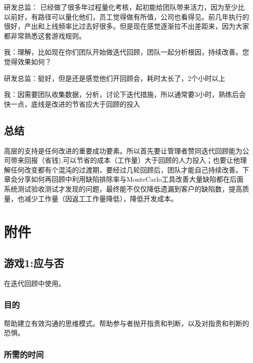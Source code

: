 研发总监：
已经做了很多年过程量化考核，起初能给团队带来活力，因为至少比以前好，有路径可以量化他们，员工觉得做有所值，公司也看得见。前几年执行的很好，产出和上线频率比过去好很多。但是现在感觉逐渐拉不出差距来，因为大家都非常熟悉这套游戏规则。

我：理解，比如现在你们团队开始做迭代回顾，团队一起分析根因，持续改善。您觉得效果如何？

研发总监：挺好，但是还是感觉他们开回顾会，耗时太长了，2个小时以上

我：因需要团队收集数据，分析，讨论下迭代措施，所以通常要3小时，熟练后会快一点，底线是改进的节省应大于回顾的投入

\hypertarget{ux603bux7ed3}{%
\subsection{总结}\label{ux603bux7ed3}}

高层的支持是任何改进的重要成功要素。所以首先要让管理者赞同迭代回顾能为公司带来回报（省钱),可以节省的成本（工作量）大于回顾的人力投入；也要让他理解任何改变都有个混沌的过渡期，要经过几轮回顾后，团队才能自己持续改善。下章会分享如何再回顾中利用缺陷排除率与MonteCarlo工具改善大量缺陷都在后面系统测试验收测试才发现的问题，最终能不仅仅降低遗漏到客户的缺陷数，提高质量，也减少工作量（因返工工作量降低），降低开发成本。

\hypertarget{ux9644ux4ef6}{%
\section{附件}\label{ux9644ux4ef6}}


\hypertarget{ux6e38ux620f1ux5e94ux4e0eux5426}{%
\subsection{游戏1:应与否}\label{ux6e38ux620f1ux5e94ux4e0eux5426}}

在迭代回顾中使用。

\hypertarget{ux76eeux7684}{%
\subsubsection{目的}\label{ux76eeux7684}}

帮助建立有效沟通的思维模式。帮助参与者抛开指责和判断，以及对指责和判断的恐惧。

\hypertarget{ux6240ux9700ux7684ux65f6ux95f4}{%
\subsubsection{所需的时间}\label{ux6240ux9700ux7684ux65f6ux95f4}}

